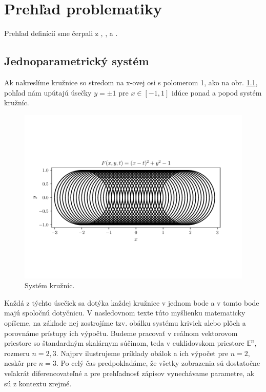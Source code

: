 \chapter{Prehľad problematiky}
\label{kap:kapitola1}
Prehľad definícií sme čerpali z \cite{Bru92}, \cite{Bru81}, \cite{doCarmo17} a \cite{Ode20}.

\section{Jednoparametrický systém}
Ak nakreslíme kružnice so stredom na x-ovej osi s polomerom 1, ako na obr. \ref{fig:system}, pohľad nám upútajú úsečky $y = \pm 1$ pre $ x \in [-1,1]$ idúce ponad a popod systém kružníc.

\begin{figure}[h]
	\centering
	\includegraphics[trim={0 1.65cm 0 2cm},clip]{images/system.pdf}
	\caption[Systém kružníc.]{Systém kružníc.}
	\label{fig:system}
\end{figure}

Každá z týchto úsečiek sa dotýka každej kružnice v jednom bode a v tomto bode majú spoločnú dotyčnicu. V nasledovnom texte túto myšlienku matematicky opíšeme, na základe nej zostrojíme tzv. obálku systému kriviek alebo plôch a porovnáme prístupy ich výpočtu. Budeme pracovať v reálnom vektorovom priestore so štandardným skalárnym súčinom, teda v euklidovskom priestore $\mathbb{E}^{n}$, rozmeru $n = 2, 3.$ Najprv ilustrujeme príklady obálok a ich výpočet pre $ n = 2,$ neskôr pre $n = 3.$ Po celý čas predpokladáme, že všetky zobrazenia sú dostatočne veľakrát diferencovateľné a pre prehľadnosť zápisov vynechávame parametre, ak sú z kontextu zrejmé.

